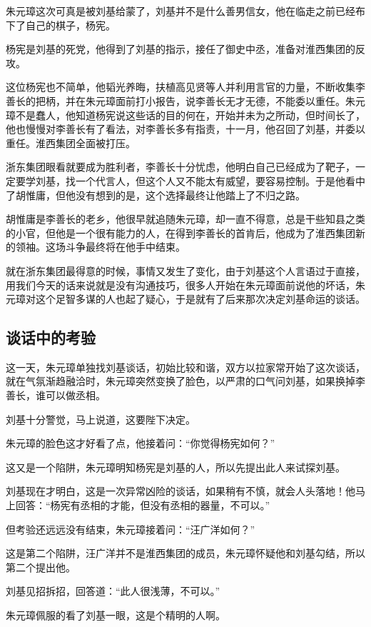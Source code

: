 \begin{multicols}{\theparacolNo}
		朱元璋这次可真是被刘基给蒙了，刘基并不是什么善男信女，他在临走之前已经布下了自己的棋子，杨宪。

		杨宪是刘基的死党，他得到了刘基的指示，接任了御史中丞，准备对淮西集团的反攻。

		这位杨宪也不简单，他韬光养晦，扶植高见贤等人并利用言官的力量，不断收集李善长的把柄，并在朱元璋面前打小报告，说李善长无才无德，不能委以重任。朱元璋不是蠢人，他知道杨宪说这些话的目的何在，开始并未为之所动，但时间长了，他也慢慢对李善长有了看法，对李善长多有指责，十一月，他召回了刘基，并委以重任。淮西集团全面被打压。

		浙东集团眼看就要成为胜利者，李善长十分忧虑，他明白自己已经成为了靶子，一定要学刘基，找一个代言人，但这个人又不能太有威望，要容易控制。于是他看中了胡惟庸，但他没有想到的是，这个选择最终让他踏上了不归之路。

		胡惟庸是李善长的老乡，他很早就追随朱元璋，却一直不得意，总是干些知县之类的小官，但他是一个很有能力的人，在得到李善长的首肯后，他成为了淮西集团新的领袖。这场斗争最终将在他手中结束。

		就在浙东集团最得意的时候，事情又发生了变化，由于刘基这个人言语过于直接，用我们今天的话来说就是没有沟通技巧，很多人开始在朱元璋面前说他的坏话，朱元璋对这个足智多谋的人也起了疑心，于是就有了后来那次决定刘基命运的谈话。

		\subsection{谈话中的考验}
		这一天，朱元璋单独找刘基谈话，初始比较和谐，双方以拉家常开始了这次谈话，就在气氛渐趋融洽时，朱元璋突然变换了脸色，以严肃的口气问刘基，如果换掉李善长，谁可以做丞相。

		刘基十分警觉，马上说道，这要陛下决定。

		朱元璋的脸色这才好看了点，他接着问：“你觉得杨宪如何？”

		这又是一个陷阱，朱元璋明知杨宪是刘基的人，所以先提出此人来试探刘基。

		刘基现在才明白，这是一次异常凶险的谈话，如果稍有不慎，就会人头落地！他马上回答：“杨宪有丞相的才能，但没有丞相的器量，不可以。”

		但考验还远远没有结束，朱元璋接着问：“汪广洋如何？”

		这是第二个陷阱，汪广洋并不是淮西集团的成员，朱元璋怀疑他和刘基勾结，所以第二个提出他。

		刘基见招拆招，回答道：“此人很浅薄，不可以。”

		朱元璋佩服的看了刘基一眼，这是个精明的人啊。


\end{multicols}
